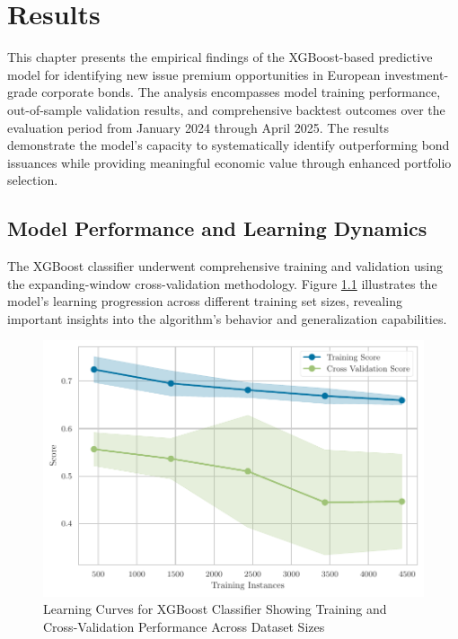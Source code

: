 \chapter{Results}
\label{ch:results}

This chapter presents the empirical findings of the XGBoost-based predictive model for identifying new issue premium opportunities in European investment-grade corporate bonds. The analysis encompasses model training performance, out-of-sample validation results, and comprehensive backtest outcomes over the evaluation period from January 2024 through April 2025. The results demonstrate the model's capacity to systematically identify outperforming bond issuances while providing meaningful economic value through enhanced portfolio selection.

\section{Model Performance and Learning Dynamics}

The XGBoost classifier underwent comprehensive training and validation using the expanding-window cross-validation methodology. Figure \ref{fig:learning_curve} illustrates the model's learning progression across different training set sizes, revealing important insights into the algorithm's behavior and generalization capabilities.

\begin{figure}[h]
    \begin{center}
        \includegraphics[width=\textwidth]{images/learning_curve.pdf}
    \end{center}
    \caption{Learning Curves for XGBoost Classifier Showing Training and Cross-Validation Performance Across Dataset Sizes}
    \label{fig:learning_curve}
\end{figure}

